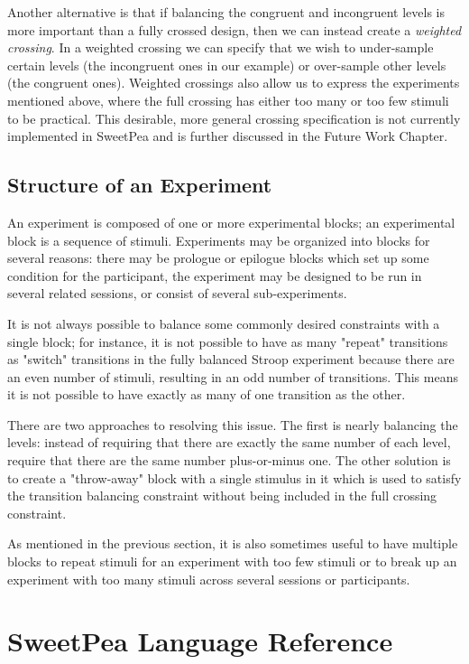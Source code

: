 Another alternative is that if balancing the congruent and incongruent levels is more important than a fully crossed design, then we can instead create a \emph{weighted crossing}. In a weighted crossing we can specify that we wish to under-sample certain levels (the incongruent ones in our example) or over-sample other levels (the congruent ones). Weighted crossings also allow us to express the experiments mentioned above, where the full crossing has either too many or too few stimuli to be practical. This desirable, more general crossing specification is not currently implemented in SweetPea and is further discussed in the Future Work Chapter.

\subsection{Structure of an Experiment}

An experiment is composed of one or more experimental blocks; an experimental block is a sequence of stimuli. Experiments may be organized into blocks for several reasons: there may be prologue or epilogue blocks which set up some condition for the participant, the experiment may be designed to be run in several related sessions, or consist of several sub-experiments.

It is not always possible to balance some commonly desired constraints with a single block; for instance, it is not possible to have as many "repeat" transitions as "switch" transitions in the fully balanced Stroop experiment because there are an even number of stimuli, resulting in an odd number of transitions. This means it is not possible to have exactly as many of one transition as the other.

There are two approaches to resolving this issue. The first is nearly balancing the levels: instead of requiring that there are exactly the same number of each level, require that there are the same number plus-or-minus one. The other solution is to create a "throw-away" block with a single stimulus in it which is used to satisfy the transition balancing constraint without being included in the full crossing constraint.

As mentioned in the previous section, it is also sometimes useful to have multiple blocks to repeat stimuli for an experiment with too few stimuli or to break up an experiment with too many stimuli across several sessions or participants.

\section{SweetPea Language Reference}

